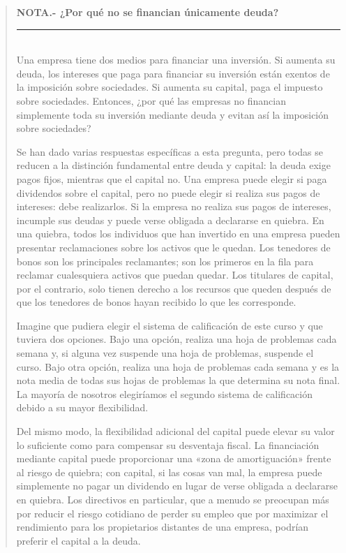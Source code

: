 \documentclass[10pt,a4paper]{article}
\newenvironment{specialblock}[1]{%
      \begin{quote} %
      \small %
      \noindent\textbf{#1}\\[-0.3em] %
      \rule{\linewidth}{0.4pt}\\[0.6em]}{
      \end{quote}}
\begin{document}
\begin{specialblock}{\textbf{NOTA.-} ¿Por qué no se financian únicamente deuda?}
    Una empresa tiene dos medios para financiar una inversión. Si aumenta su deuda, los intereses que paga para financiar su inversión están exentos de la imposición sobre sociedades. Si aumenta su capital, paga el impuesto sobre sociedades. Entonces, ¿por qué las empresas no financian simplemente toda su inversión mediante deuda y evitan así la imposición sobre sociedades?

    Se han dado varias respuestas específicas a esta pregunta, pero todas se reducen a la distinción fundamental entre deuda y capital: la deuda exige pagos fijos, mientras que el capital no. Una empresa puede elegir si paga dividendos sobre el capital, pero no puede elegir si realiza sus pagos de intereses: debe realizarlos. Si la empresa no realiza sus pagos de intereses, incumple sus deudas y puede verse obligada a declararse en quiebra. En una quiebra, todos los individuos que han invertido en una empresa pueden presentar reclamaciones sobre los activos que le quedan. Los tenedores de bonos son los principales reclamantes; son los primeros en la fila para reclamar cualesquiera activos que puedan quedar. Los titulares de capital, por el contrario, solo tienen derecho a los recursos que queden después de que los tenedores de bonos hayan recibido lo que les corresponde.
    
    Imagine que pudiera elegir el sistema de calificación de este curso y que tuviera dos opciones. Bajo una opción, realiza una hoja de problemas cada semana y, si alguna vez suspende una hoja de problemas, suspende el curso. Bajo otra opción, realiza una hoja de problemas cada semana y es la nota media de todas sus hojas de problemas la que determina su nota final. La mayoría de nosotros elegiríamos el segundo sistema de calificación debido a su mayor flexibilidad.
    
    Del mismo modo, la flexibilidad adicional del capital puede elevar su valor lo suficiente como para compensar su desventaja fiscal. La financiación mediante capital puede proporcionar una «zona de amortiguación» frente al riesgo de quiebra; con capital, si las cosas van mal, la empresa puede simplemente no pagar un dividendo en lugar de verse obligada a declararse en quiebra. Los directivos en particular, que a menudo se preocupan más por reducir el riesgo cotidiano de perder su empleo que por maximizar el rendimiento para los propietarios distantes de una empresa, podrían preferir el capital a la deuda.
    

\end{specialblock}
\end{document}
